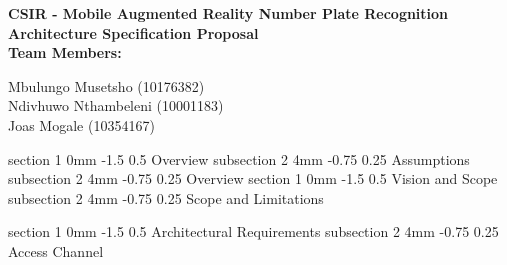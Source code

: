 \documentclass[12pt]{article}
\makeatletter
\newcommand{\Title}{CSIR - Mobile Augmented Reality Number Plate Recognition} %
\renewcommand{\section}{\@startsection
   {section}%
   {1}%
   {0mm}%
   {-1.5\baselineskip}%
   {0.5\baselineskip}%
   {\sffamily\bfseries\upshape\normalsize}}%
\renewcommand{\subsection}{\@startsection
   {subsection}%
   {2}%
   {4mm}%
   {-0.75\baselineskip}%
   {0.25\baselineskip}%
   {\rmfamily\normalfont\scshape\normalsize}}%
\makeatother
\begin{document}
        \vspace{4em}
        
        \begin{center}%
        
          \LARGE \bf \Title \\[4em]
          \LARGE {\bf Architecture Specification Proposal}\\[1em]
          \LARGE {\bf Team Members:}\\[2em]
          \large
          
             Mbulungo Musetsho                          (10176382) \\[1em]
             Ndivhuwo Nthambeleni (10001183)	\\[1em]
             Joas Mogale (10354167)		\\[1em]
            
        \end{center}%
        

        \newpage
        \tableofcontents    
                \newpage
                \section{Overview}
                		\subsection{Assumptions}
                		\subsection{Overview }
                \section{Vision and Scope}
                		\subsection{Scope and Limitations }
                		
                \section{Architectural Requirements}
                		\subsection{Access Channel }
\end{document}
